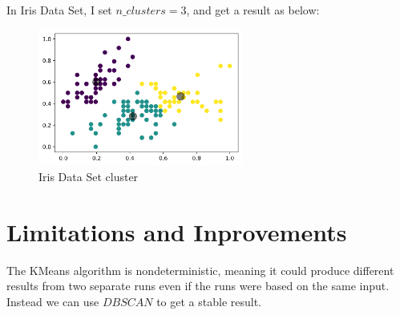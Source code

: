 \documentclass{article}
\begin{document}
		In Iris Data Set, I set $n\_clusters=3$, and get a result as below:
			\begin{figure}[H]
				\centering
				\includegraphics[width=0.6\textwidth]{2.png}
				\caption{Iris Data Set cluster}
				\label{Fig.main5}
			\end{figure}

	\section{Limitations and Inprovements}
		The KMeans algorithm is nondeterministic, meaning it could produce different results from two separate runs
		even if the runs were based on the same input. Instead we can use $DBSCAN$ to get a stable result.
\end{document}
